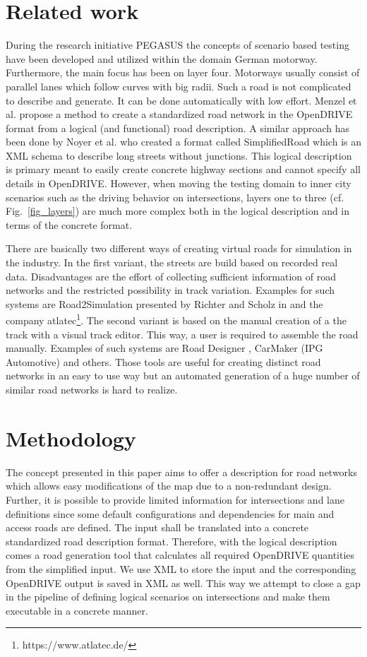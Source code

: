\documentclass[a4paper, 10pt, conference]{ieeeconf}      %
\begin{document}
\section{Related work}
During the research initiative PEGASUS \cite{pegasus.2019} the concepts of scenario based testing have been developed and utilized within the domain German motorway. Furthermore, the main focus has been on layer four. Motorways usually consist of parallel lanes which follow curves with big radii. Such a road is not complicated to describe and generate. It can be done automatically with low effort. Menzel et al. \cite{menzel2019functional} propose a method to create a standardized road network in the OpenDRIVE format from a logical (and functional) road description. 
A similar approach has been done by Noyer et al. \cite{dlrODRgen} who created a format called SimplifiedRoad which is an XML schema to describe long streets without junctions. This logical description is primary meant to easily create concrete highway sections and cannot specify all details in OpenDRIVE. However, when moving the testing domain to inner city scenarios such as the driving behavior on intersections, layers one to three (cf. Fig.~\ref{fig_layers}) are much more complex both in the logical description and in terms of the concrete format. 

There are basically two different ways of creating virtual roads for simulation in the industry. In the first variant, the streets are build based on recorded real data. Disadvantages are the effort of collecting sufficient information of road networks and the restricted possibility in track variation. Examples for such systems are Road2Simulation presented by Richter and Scholz in \cite{dlr110094} and the company atlatec\footnote{https://www.atlatec.de/}.
The second variant is based on the manual creation of a the track with a visual track editor. This way, a user is required to assemble the road manually. Examples of such systems are Road Designer \cite{ROD}, CarMaker (IPG Automotive) and others. Those tools are useful for creating distinct road networks in an easy to use way but an automated generation of a huge number of similar road networks is hard to realize.

\section{Methodology}
The concept presented in this paper aims to offer a description for road networks which allows easy modifications of the map due to a non-redundant design. Further, it is possible to provide limited information for intersections and lane definitions since some default configurations and dependencies for main and access roads are defined. The input shall be translated into a concrete standardized road description format. Therefore, with the logical description comes a road generation tool that calculates all required OpenDRIVE quantities from the simplified input. We use XML to store the input and the corresponding OpenDRIVE output is saved in XML as well. This way we attempt to close a gap in the pipeline of defining logical scenarios on intersections and make them executable in a concrete manner.
\end{document}
